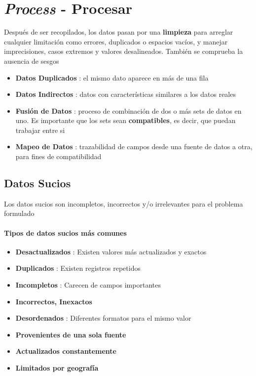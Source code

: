 \section{\textit{Process} - Procesar}
Después de ser recopilados, los datos pasan por una \textbf{limpieza} para arreglar cualquier limitación como errores, duplicados o espacios vacíos, y manejar imprecisiones, casos extremos y valores desalineados. También se comprueba la ausencia de sesgos
\begin{itemize}
    \item {\textbf{Datos Duplicados} : el mismo dato aparece en más de una fila}
    \item {\textbf{Datos Indirectos} : datos con características similares a los datos reales}
    \item {\textbf{Fusión de Datos} : proceso de combinación de dos o más sets de datos en uno. Es importante que los sets sean \textbf{compatibles}, es decir, que puedan trabajar entre si}
    \item {\textbf{Mapeo de Datos} : trazabilidad de campos desde una fuente de datos a otra, para fines de compatibilidad}
\end{itemize}

\subsection{Datos Sucios}
Los datos sucios son incompletos, incorrectos y/o irrelevantes para el problema formulado
\paragraph{Tipos de datos sucios más comunes}
\begin{itemize}
    \item {\textbf{Desactualizados} : Existen valores más actualizados y exactos}
    \item {\textbf{Duplicados} : Existen registros repetidos}
    \item {\textbf{Incompletos} : Carecen de campos importantes}
    \item {\textbf{Incorrectos, Inexactos}}
    \item {\textbf{Desordenados} : Diferentes formatos para el mismo valor}
    \item {\textbf{Provenientes de una sola fuente}}
    \item {\textbf{Actualizados constantemente}}
    \item {\textbf{Limitados por geografía}}
\end{itemize}

